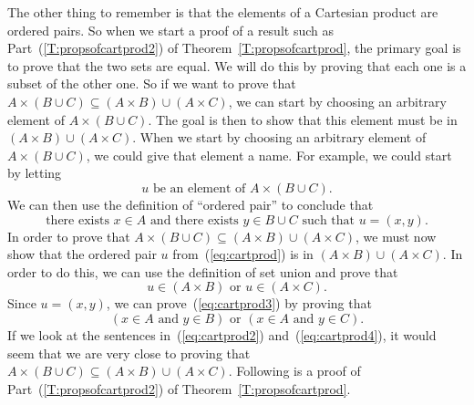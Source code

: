 The other thing to remember is that the elements of a Cartesian product are ordered pairs.  So when we start a proof of a result such as Part~(\ref{T:propsofcartprod2}) of Theorem~\ref{T:propsofcartprod}, the primary goal is to prove that the two sets are equal.  We will do this by proving that each one is a subset of the other one.  So if we want to prove that   
$A \times \left( {B \cup C} \right) \subseteq \left( {A \times B} \right) \cup \left( {A \times C} \right)$, we can start by choosing an arbitrary element of  
$A \times \left( {B \cup C} \right)$.  The goal is then to show that this element must be in  
$\left( {A \times B} \right) \cup \left( {A \times C} \right)$.  When we start by choosing an arbitrary element of  $A \times \left( {B \cup C} \right)$, we could give that element a name.  For example, we could start by letting
\setcounter{equation}{0}
\begin{equation} \label{eq:cartprod}
u \text{ be an element of } A \times \left( {B \cup C} \right)\!.
\end{equation}
We can then use the definition of ``ordered pair'' to conclude that 
\begin{equation} \label{eq:cartprod2}
\text{there exists } x \in A  \text{ and there exists } y \in B \cup C \text{ such that }  u = \left( {x,y} \right).
\end{equation}
In order to prove that $A \times \left( {B \cup C} \right) \subseteq \left( {A \times B} \right) \cup \left( {A \times C} \right)$, we must now show that the ordered pair $u$ from~(\ref{eq:cartprod}) is in 
$\left( {A \times B} \right) \cup \left( {A \times C} \right)$. In order to do this, we can use the definition of set union and prove that
\begin{equation} \label{eq:cartprod3}
u \in (A \times B) \text{ or } u \in (A \times C).
\end{equation}
Since $u = (x, y)$, we can prove~(\ref{eq:cartprod3}) by proving that
\begin{equation} \label{eq:cartprod4}
\left( x \in A \text{ and } y \in B \right) \text{ or } \left( x \in A \text{ and } y \in C \right).
\end{equation}
If we look at the sentences in~(\ref{eq:cartprod2}) and~(\ref{eq:cartprod4}), it would seem that we are very close to proving that 
$A \times \left( {B \cup C} \right) \subseteq \left( {A \times B} \right) \cup \left( {A \times C} \right)$.  
Following is a proof of Part~(\ref{T:propsofcartprod2}) of Theorem~\ref{T:propsofcartprod}.
%
\addtocounter{theorem}{-1}
\setcounter{equation}{0}
%

